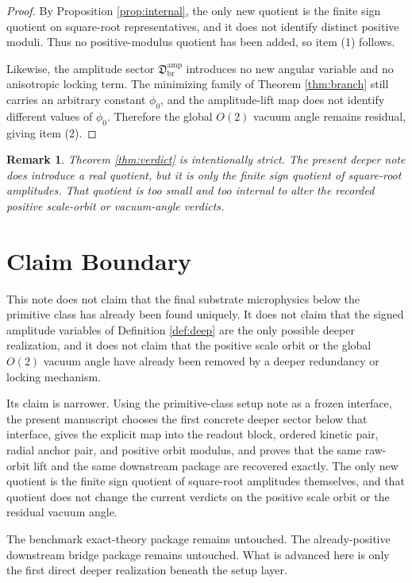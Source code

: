 \documentclass[11pt]{article}
\newcommand{\DeepSector}{\mathfrak D_{\mathrm{br}}^{\mathrm{amp}}}
\newtheorem{remark}{Remark}
\begin{document}
\begin{proof}
By Proposition \ref{prop:internal}, the only new quotient is the finite sign quotient on square-root representatives, and it does not identify distinct positive moduli. Thus no positive-modulus quotient has been added, so item (1) follows.

Likewise, the amplitude sector \(\DeepSector\) introduces no new angular variable and no anisotropic locking term. The minimizing family of Theorem \ref{thm:branch} still carries an arbitrary constant \(\phi_{0}\), and the amplitude-lift map does not identify different values of \(\phi_{0}\). Therefore the global \(O(2)\) vacuum angle remains residual, giving item (2).
\end{proof}

\begin{remark}
Theorem \ref{thm:verdict} is intentionally strict. The present deeper note \emph{does} introduce a real quotient, but it is only the finite sign quotient of square-root amplitudes. That quotient is too small and too internal to alter the recorded positive scale-orbit or vacuum-angle verdicts.
\end{remark}

\section{Claim Boundary}

This note does not claim that the final substrate microphysics below the primitive class has already been found uniquely. It does not claim that the signed amplitude variables of Definition \ref{def:deep} are the only possible deeper realization, and it does not claim that the positive scale orbit or the global \(O(2)\) vacuum angle have already been removed by a deeper redundancy or locking mechanism.

Its claim is narrower. Using the primitive-class setup note as a frozen interface, the present manuscript chooses the first concrete deeper sector below that interface, gives the explicit map into the readout block, ordered kinetic pair, radial anchor pair, and positive orbit modulus, and proves that the same raw-orbit lift and the same downstream package are recovered exactly. The only new quotient is the finite sign quotient of square-root amplitudes themselves, and that quotient does not change the current verdicts on the positive scale orbit or the residual vacuum angle.

The benchmark exact-theory package remains untouched. The already-positive downstream bridge package remains untouched. What is advanced here is only the first direct deeper realization beneath the setup layer.
\end{document}
